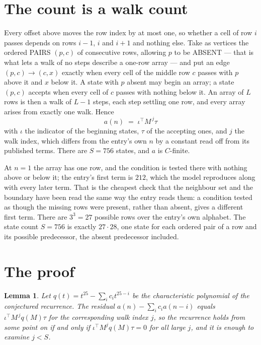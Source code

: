 \documentclass[11pt,a4paper]{article}
\theoremstyle{plain}
\newtheorem{lemma}[theorem]{Lemma}
\theoremstyle{definition}
\begin{document}
\section{The count is a walk count}

Every offset above moves the row index by at most one, so whether a cell of row $i$ passes
depends on rows $i-1$, $i$ and $i+1$ and nothing else. Take as vertices the ordered PAIRS
$(p,c)$ of consecutive rows, allowing $p$ to be ABSENT --- that is what lets a walk of no steps
describe a one-row array --- and put an edge $(p,c)\to(c,x)$ exactly when every cell of the
middle row $c$ passes with $p$ above it and $x$ below it. A state with $p$ absent may begin an
array; a state $(p,c)$ accepts when every cell of $c$ passes with nothing below it. An array of
$L$ rows is then a walk of $L-1$ steps, each step settling one row, and every array arises from
exactly one walk. Hence
\[
a(n)\;=\;\iota^{\!\top}M^{\,j}\tau
\]
with $\iota$ the indicator of the beginning states, $\tau$ of the accepting ones, and $j$ the
walk index, which differs from the entry's own $n$ by a constant read off from its published
terms. There are $S=756$ states, and $a$ is $C$-finite.

At $n=1$ the array has one row, and
the condition is tested there with nothing above or below it; the entry's first term is
$212$, which the model reproduces along with every later term. That is the cheapest check
that the neighbour set and the boundary have been read the same way the entry reads them: a
condition tested as though the missing rows were present, rather than absent, gives a different
first term. There are $3^{3}=27$ possible rows over the entry's own alphabet. The state count $S=756$ is exactly $27\cdot28$,
one state for each ordered pair of a row and its possible predecessor, the absent predecessor
included.

\section{The proof}

\begin{lemma}\label{lem:crit}
Let $q(t)=t^{25}-\sum_i c_it^{25-i}$ be the characteristic polynomial of the
conjectured recurrence. The residual $a(n)-\sum_ic_ia(n-i)$ equals
$\iota^{\!\top}M^{\,j}q(M)\tau$ for the corresponding walk index $j$, so the recurrence
holds from some point on if and only if $\iota^{\!\top}M^{j}q(M)\tau=0$ for all large $j$,
and it is enough to examine $j<S$.
\end{lemma}
\end{document}
